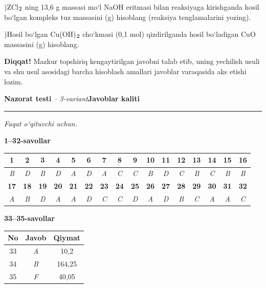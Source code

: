 \documentclass[11pt,a4paper]{article}
\renewcommand{\textsubscript}[1]{\ensuremath{_{\text{\fontsize{8}{8}\selectfont #1}}}}
\newcommand{\qsep}{\par\vspace{1pt}\noindent\rule{0pt}{0.4pt}\par\vspace{5pt}}
\newcommand{\diqqat}[1]{\par\smallskip\noindent\textbf{Diqqat!} #1\par\medskip}
\begin{document}
)ZCl\textsubscript{2} ning 13,6 g massasi mo`l NaOH eritmasi bilan reaksiyaga kirishganda hosil bo`lgan kompleks tuz massasini (g) hisoblang (reaksiya tenglamalarini yozing).\par
{})Hosil bo`lgan Cu(OH)\textsubscript{2} cho`kmasi (0,1 mol) qizdirilganda hosil bo`ladigan CuO massasini (g) hisoblang.\par
\diqqat{Mazkur topshiriq kengaytirilgan javobni talab etib, uning yechilish usuli va shu usul asosidagi barcha hisoblash amallari javoblar varaqasida aks etishi lozim.}\qsep
\newpage
\noindent\textbf{\fontsize{13}{15}\selectfont Nazorat testi}\ \textit{$\cdot$ 3-variant}\hfill \textbf{Javoblar kaliti}\par\smallskip\hrule\smallskip
\textit{Faqat o`qituvchi uchun.}\par\medskip
\noindent\textbf{1--32-savollar}\par\smallskip
\noindent\begin{tabular}{|c|c|c|c|c|c|c|c|c|c|c|c|c|c|c|c|}\hline
\textbf{1} & \textbf{2} & \textbf{3} & \textbf{4} & \textbf{5} & \textbf{6} & \textbf{7} & \textbf{8} & \textbf{9} & \textbf{10} & \textbf{11} & \textbf{12} & \textbf{13} & \textbf{14} & \textbf{15} & \textbf{16}\\\hline
\textsl{B} & \textsl{D} & \textsl{B} & \textsl{D} & \textsl{A} & \textsl{D} & \textsl{A} & \textsl{C} & \textsl{C} & \textsl{B} & \textsl{D} & \textsl{C} & \textsl{B} & \textsl{C} & \textsl{B} & \textsl{B}\\\hline
\textbf{17} & \textbf{18} & \textbf{19} & \textbf{20} & \textbf{21} & \textbf{22} & \textbf{23} & \textbf{24} & \textbf{25} & \textbf{26} & \textbf{27} & \textbf{28} & \textbf{29} & \textbf{30} & \textbf{31} & \textbf{32}\\\hline
\textsl{A} & \textsl{B} & \textsl{D} & \textsl{A} & \textsl{A} & \textsl{D} & \textsl{C} & \textsl{C} & \textsl{D} & \textsl{A} & \textsl{D} & \textsl{B} & \textsl{C} & \textsl{A} & \textsl{A} & \textsl{C}\\\hline
\end{tabular}\par\medskip
\noindent\textbf{33--35-savollar}\par\smallskip
\noindent\begin{tabular}{|c|c|c|}\hline \textbf{No} & \textbf{Javob} & \textbf{Qiymat}\\\hline
33 & \textsl{A} & 10,2\\\hline
34 & \textsl{B} & 164,25\\\hline
35 & \textsl{F} & 40,05\\\hline
\end{tabular}\par\medskip
\end{document}
